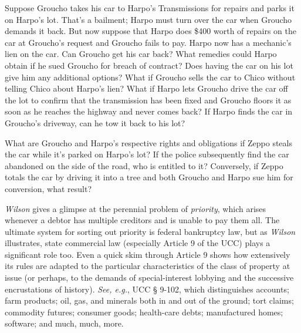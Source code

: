 \item Suppose Groucho takes his car to Harpo's Transmissions for repairs and
parks it on Harpo's lot. That's a bailment; Harpo must turn over the car when
Groucho demands it back. But now suppose that Harpo does \$400 worth of repairs
on the car at Groucho's request and Groucho fails to pay. Harpo now has a
mechanic's lien on the car. Can Groucho get his car back? What remedies could
Harpo obtain if he sued Groucho for breach of contract? Does having the car on
his lot give him any additional options? What if Groucho sells the car to Chico
without telling Chico about Harpo's lien? What if Harpo lets Groucho drive the
car off the lot to confirm that the transmission has been fixed and Groucho
floors it as soon as he reaches the highway and never comes back? If Harpo
finds the car in Groucho's driveway, can he tow it back to his lot?


\item What are Groucho and Harpo's respective rights and obligations if Zeppo
steals the car while it's parked on Harpo's lot? If the police subsequently
find the car abandoned on the side of the road, who is entitled to it?
Conversely, if Zeppo totals the car by driving it into a tree and both Groucho
and Harpo sue him for conversion, what result?


\item \textit{Wilson} gives a glimpse at the perennial problem of
\textit{priority}, which arises whenever a debtor has multiple creditors and is
unable to pay them all. The ultimate system for sorting out priority is federal
bankruptcy law, but as \textit{Wilson} illustrates, state commercial law
(especially Article 9 of the UCC) plays a significant role too. Even a quick
skim through Article 9 shows how extensively its rules are adapted to the
particular characteristics of the class of property at issue (or perhaps, to
the demands of special-interest lobbying and the successive encrustations of
history). \emph{See, e.g.}, UCC {\S} 9-102, which distinguishes accounts; farm
products; oil, gas, and minerals both in and out of the ground; tort claims;
commodity futures; consumer goods; health-care debts; manufactured homes;
software; and much, much, more. 


